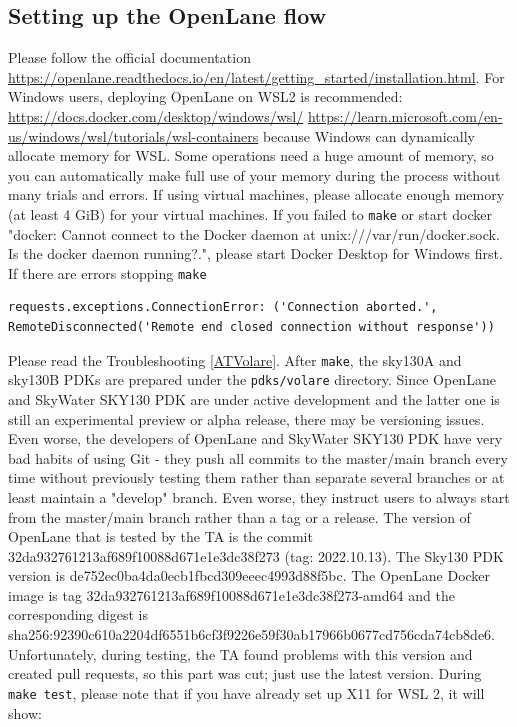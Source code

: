 \documentclass[a4paper,12pt,twoside]{article}
\begin{document}
\subsection{Setting up the OpenLane flow}
Please follow the official documentation \url{https://openlane.readthedocs.io/en/latest/getting_started/installation.html}. For Windows users, deploying OpenLane on WSL2 is recommended: \url{https://docs.docker.com/desktop/windows/wsl/} \url{https://learn.microsoft.com/en-us/windows/wsl/tutorials/wsl-containers} because Windows can dynamically allocate memory for WSL. Some operations need a huge amount of memory, so you can automatically make full use of your memory during the process without many trials and errors. If using virtual machines, please allocate enough memory (at least 4 GiB) for your virtual machines. If you failed to \texttt{make} or start docker "docker: Cannot connect to the Docker daemon at unix:///var/run/docker.sock. Is the docker daemon running?.", please start Docker Desktop for Windows first. If there are errors stopping \texttt{make}
\begin{verbatim}
requests.exceptions.ConnectionError: ('Connection aborted.', RemoteDisconnected('Remote end closed connection without response'))
\end{verbatim}
Please read the Troubleshooting \ref{ATVolare}. After \texttt{make}, the sky130A and sky130B PDKs are prepared under the \texttt{pdks/volare} directory. Since OpenLane and SkyWater SKY130 PDK are under active development and the latter one is still an experimental preview or alpha release, there may be versioning issues. Even worse, the developers of OpenLane and SkyWater SKY130 PDK have very bad habits of using Git - they push all commits to the master/main branch every time without previously testing them rather than separate several branches or at least maintain a "develop" branch. Even worse, they instruct users to always start from the master/main branch rather than a tag or a release. The version of OpenLane that is tested by the TA is the commit 32da932761213af689f10088d671e1e3dc38f273 (tag: 2022.10.13). The Sky130 PDK version is de752ec0ba4da0ecb1fbcd309eeec4993d88f5bc. The OpenLane Docker image is tag 32da932761213af689f10088d671e1e3dc38f273-amd64 and the corresponding digest is sha256:92390c610a2204df6551b6cf3f9226e59f30ab17966b0677cd756cda74cb8de6. Unfortunately, during testing, the TA found problems with this version and created pull requests, so this part was cut; just use the latest version. During \texttt{make test}, please note that if you have already set up X11 for WSL 2, it will show:
\end{document}
